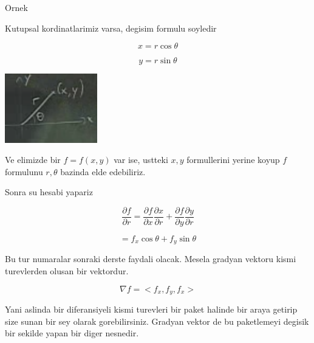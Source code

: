 \documentclass[12pt,fleqn]{article}\usepackage{../common}
\begin{document}
Ornek

Kutupsal kordinatlarimiz varsa, degisim formulu soyledir

\[ x = r \cos \theta \]

\[ y = r \sin \theta \]

\includegraphics[height=3cm]{11_1.png}

Ve elimizde bir $f=f(x,y)$ var ise, ustteki $x,y$ formullerini yerine
koyup $f$ formulunu $r,\theta$ bazinda elde edebiliriz.

Sonra su hesabi yapariz

\[ \frac{\partial f}{\partial r} = 
\frac{\partial f}{\partial x}
\frac{\partial x}{\partial r} +
\frac{\partial f}{\partial y}
\frac{\partial y}{\partial r}
 \]

\[ = f_x\cos \theta + f_y \sin \theta \]

Bu tur numaralar sonraki derste faydali olacak. Mesela gradyan vektoru
kismi turevlerden olusan bir vektordur. 

\[ \nabla f = <f_x,f_y,f_x> \]

Yani aslinda bir diferansiyeli kismi turevleri bir paket halinde bir araya
getirip size sunan bir sey olarak gorebilirsiniz. Gradyan vektor de bu
paketlemeyi degisik bir sekilde yapan bir diger nesnedir. 
\end{document}
